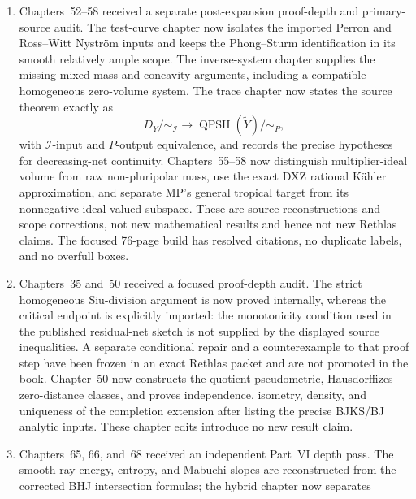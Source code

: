 \begin{enumerate}
  \cite{Wu22AffineEnergy,Wu24AffineCones}.  The rational-Reeb comparison now
  retains the factor \(1/\vol(\xi)\), the bi-Lipschitz Monge--Amp\`ere map is
  explicitly only onto its image, proportional Reeb rescaling is separated
  from the open nonproportional comparison problem, and only the
  Fubini--Study product, finite-energy class, and energy are claimed to
  recover their global BJ counterparts.
\item Chapters~52--58 received a separate post-expansion proof-depth and
  primary-source audit.  The test-curve chapter now isolates the imported
  Perron and Ross--Witt Nystr\"om inputs and keeps the Phong--Sturm
  identification in its smooth relatively ample scope.  The inverse-system
  chapter supplies the missing mixed-mass and concavity arguments, including
  a compatible homogeneous zero-volume system.  The trace chapter now states
  the source theorem exactly as
  \[
    D_Y/{\sim_{\mathcal I}}\longrightarrow
    \operatorname{QPSH}(\widetilde Y)/{\sim_P},
  \]
  with \(\mathcal I\)-input and \(P\)-output equivalence, and records the
  precise hypotheses for decreasing-net continuity.  Chapters~55--58 now
  distinguish multiplier-ideal volume from raw non-pluripolar mass, use the
  exact DXZ rational K\"ahler approximation, and separate MP's general
  tropical target from its nonnegative ideal-valued subspace.  These are
  source reconstructions and scope corrections, not new mathematical results
  and hence not new Rethlas claims.  The focused 76-page build has resolved
  citations, no duplicate labels, and no overfull boxes.
\item Chapters~35 and~50 received a focused proof-depth audit.  The strict
  homogeneous Siu-division argument is now proved internally, whereas the
  critical endpoint is explicitly imported: the monotonicity condition used
  in the published residual-net sketch is not supplied by the displayed
  source inequalities.  A separate conditional repair and a counterexample
  to that proof step have been frozen in an exact Rethlas packet and are not
  promoted in the book.  Chapter~50 now constructs the quotient
  pseudometric, Hausdorffizes zero-distance classes, and proves independence,
  isometry, density, and uniqueness of the completion extension after listing
  the precise BJKS/BJ analytic inputs.  These chapter edits introduce no new
  result claim.
\item Chapters~65, 66, and~68 received an independent Part~VI depth pass.
  The smooth-ray energy, entropy, and Mabuchi slopes are reconstructed from
  the corrected BHJ intersection formulas; the hybrid chapter now separates

\end{enumerate}
